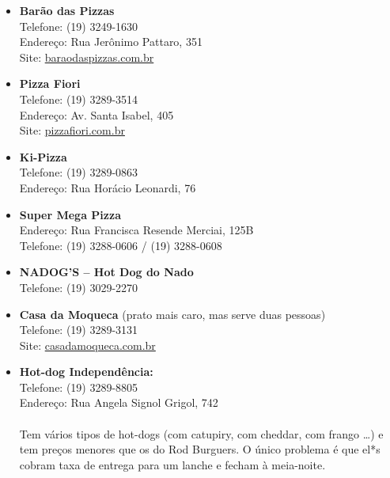 \begin{itemize}
    \item   \textbf{Barão das Pizzas}
        \\Telefone: (19) 3249-1630
        \\Endereço: Rua Jerônimo Pattaro, 351
        \\Site: \url{baraodaspizzas.com.br}

    \item   \textbf{Pizza Fiori}
        \\Telefone: (19) 3289-3514
        \\Endereço: Av. Santa Isabel, 405
        \\Site: \url{pizzafiori.com.br}

    \item   \textbf{Ki-Pizza}
        \\Telefone: (19) 3289-0863
        \\Endereço: Rua Horácio Leonardi, 76

    \item   \textbf{Super Mega Pizza}
        \\Endereço: Rua Francisca Resende Merciai, 125B
        \\Telefone: (19) 3288-0606 / (19) 3288-0608

    \item   \textbf{NADOG'S -- Hot Dog do Nado}
        \\Telefone: (19) 3029-2270

    \item   \textbf{Casa da Moqueca} (prato mais caro, mas serve duas pessoas)
        \\Telefone: (19) 3289-3131
        \\Site: \url{casadamoqueca.com.br}



    \item   \textbf{Hot-dog Independência:}
        \\Telefone: (19) 3289-8805
        \\Endereço: Rua Angela Signol Grigol, 742
        \\\\
        Tem vários tipos de hot-dogs (com catupiry, com cheddar, com frango
        {\dots}) e tem preços menores que os do Rod Burguers. O único problema
        é que el*s cobram taxa de entrega para um lanche e fecham à meia-noite.


\end{itemize}

